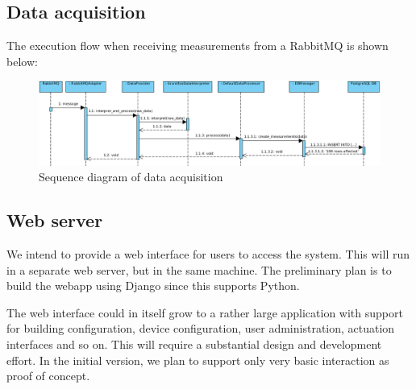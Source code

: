 \newpage
\subsection{Data acquisition}
The execution flow when receiving measurements from a RabbitMQ is shown below:
\begin{figure}[H]
    \centering
    \includegraphics[width=\textwidth]{figures/data_acq_seq_diagram}
    \caption{Sequence diagram of data acquisition}
    \label{figureSeqDiagram}
\end{figure}


\subsection{Web server}\label{subsection:webserver}
We intend to provide a web interface for users to access the system. This will run in a separate web server, but in the same machine. The preliminary plan is to build the webapp using Django since this supports Python. 

The web interface could in itself grow to a rather large application with support for building configuration, device configuration, user administration, actuation interfaces and so on. This will require a substantial design and development effort. In the initial version, we plan to support only very basic interaction as proof of concept.